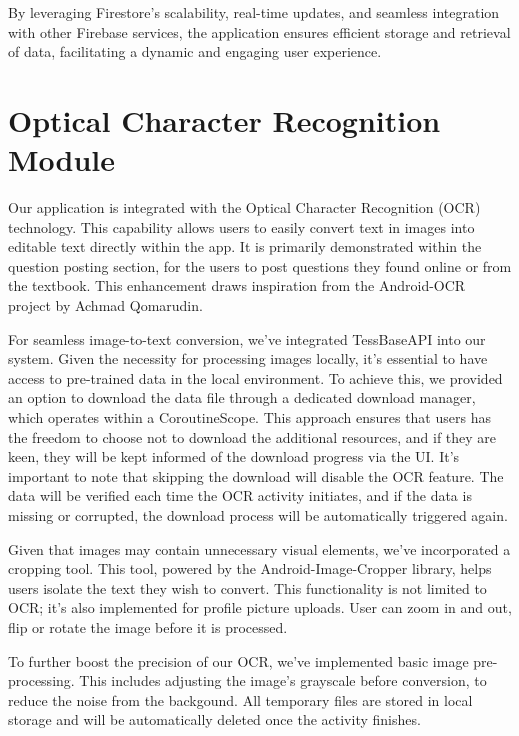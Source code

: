 By leveraging Firestore's scalability, real-time updates, and seamless integration with other Firebase services, the application ensures efficient storage and retrieval of data, facilitating a dynamic and engaging user experience.


\section{Optical Character Recognition Module}
Our application is integrated with the Optical Character Recognition (OCR) technology. This capability allows users to easily convert text in images into editable text directly within the app. It is primarily demonstrated within the question posting section, for the users to post questions they found online or from the textbook. This enhancement draws inspiration from the Android-OCR project by Achmad Qomarudin.

For seamless image-to-text conversion, we've integrated TessBaseAPI into our system. Given the necessity for processing images locally, it's essential to have access to pre-trained data in the local environment. To achieve this, we provided an option to download the data file through a dedicated download manager, which operates within a CoroutineScope. This approach ensures that users has the freedom to choose not to download the additional resources, and if they are keen, they will be kept informed of the download progress via the UI. It's important to note that skipping the download will disable the OCR feature. The data will be verified each time the OCR activity initiates, and if the data is missing or corrupted, the download process will be automatically triggered again.

Given that images may contain unnecessary visual elements, we've incorporated a cropping tool. This tool, powered by the Android-Image-Cropper library, helps users isolate the text they wish to convert. This functionality is not limited to OCR; it's also implemented for profile picture uploads. User can zoom in and out, flip or rotate the image before it is processed.

To further boost the precision of our OCR, we've implemented basic image pre-processing. This includes adjusting the image's grayscale before conversion, to reduce the noise from the backgound. All temporary files are stored in local storage and will be automatically deleted once the activity finishes.

